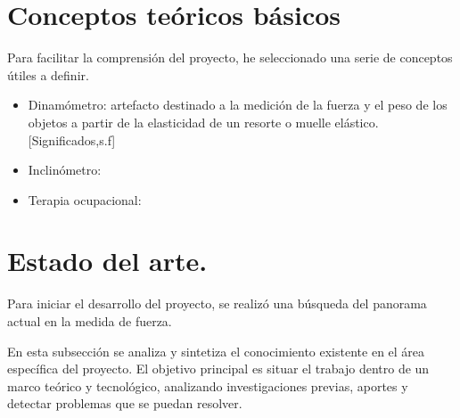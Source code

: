 \section{Conceptos teóricos básicos}
Para facilitar la comprensión del proyecto, he seleccionado una serie de conceptos útiles a definir. 
\begin{itemize}
    \item Dinamómetro: artefacto destinado a la medición de la fuerza y el peso de los objetos a partir de la elasticidad de un resorte o muelle elástico.[Significados,s.f]
    \item Inclinómetro:
    \item Terapia ocupacional: 

\end{itemize}

\section{Estado del arte.}

Para iniciar el desarrollo del proyecto, se realizó una búsqueda del panorama actual en la medida de fuerza. 

En esta subsección se analiza y sintetiza el conocimiento existente en el área específica del proyecto. El objetivo principal es situar el trabajo dentro de un marco teórico y tecnológico, analizando investigaciones previas, aportes y detectar problemas que se puedan resolver.
